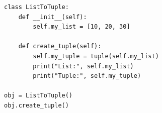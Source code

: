 \begin{verbatim}
class ListToTuple:
    def __init__(self):
        self.my_list = [10, 20, 30]

    def create_tuple(self):
        self.my_tuple = tuple(self.my_list)
        print("List:", self.my_list)
        print("Tuple:", self.my_tuple)

obj = ListToTuple()
obj.create_tuple()
\end{verbatim}